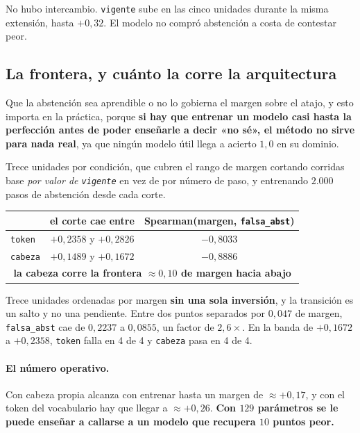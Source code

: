 \documentclass[11pt,a4paper]{article}
\begin{document}
No hubo intercambio. \texttt{vigente} sube en las cinco unidades durante la misma extensión, hasta
$+0{,}32$. El modelo no compró abstención a costa de contestar peor.

\subsection{La frontera, y cuánto la corre la arquitectura}
\label{sec:frontera}

Que la abstención sea aprendible o no lo gobierna el margen sobre el atajo, y esto importa en la
práctica, porque \textbf{si hay que entrenar un modelo casi hasta la perfección antes de poder
enseñarle a decir «no sé», el método no sirve para nada real}, ya que ningún modelo útil llega a
acierto $1{,}0$ en su dominio.

Trece unidades por condición, que cubren el rango de margen cortando corridas base \emph{por valor de
\texttt{vigente}} en vez de por número de paso, y entrenando $2{.}000$ pasos de abstención desde cada
corte.

\begin{center}
\begin{tabular}{lcc}
\toprule
 & el corte cae entre & Spearman(margen, \texttt{falsa\_abst}) \\
\midrule
\texttt{token}  & $+0{,}2358$ y $+0{,}2826$ & $-0{,}8033$ \\
\texttt{cabeza} & $+0{,}1489$ y $+0{,}1672$ & $-0{,}8886$ \\
\midrule
\multicolumn{3}{c}{\textbf{la cabeza corre la frontera $\approx 0{,}10$ de margen hacia abajo}}\\
\bottomrule
\end{tabular}
\end{center}

Trece unidades ordenadas por margen \textbf{sin una sola inversión}, y la transición es un salto y no
una pendiente. Entre dos puntos separados por $0{,}047$ de margen, \texttt{falsa\_abst} cae de
$0{,}2237$ a $0{,}0855$, un factor de $2{,}6\times$. En la banda de $+0{,}1672$ a $+0{,}2358$,
\texttt{token} falla en 4 de 4 y \texttt{cabeza} pasa en 4 de 4.

\paragraph{El número operativo.} Con cabeza propia alcanza con entrenar hasta un margen de
$\approx +0{,}17$, y con el token del vocabulario hay que llegar a $\approx +0{,}26$. \textbf{Con
$129$ parámetros se le puede enseñar a callarse a un modelo que recupera $10$ puntos peor.}
\end{document}
